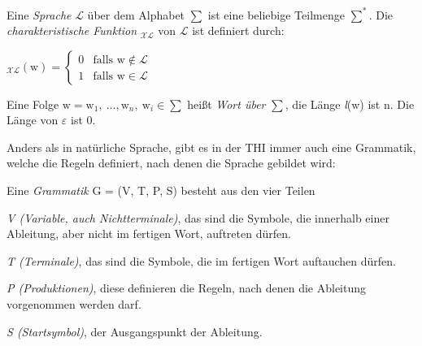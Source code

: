 \documentclass[11pt, a4paper]{article}
\newcommand{\Lagr}{\mathcal{L}}
\begin{document}
\begin{flushleft}
    \begin{tcolorbox}[title = Definition 1.3]
        Eine \emph{Sprache} \(\Lagr\) über dem Alphabet \(\sum\) ist eine beliebige Teilmenge \(\sum^*\). Die \emph{charakteristische Funktion} \(_\mathcal{XL}\) von \(\Lagr\) ist definiert durch:
        \vspace{1em}
        \begin{center}
            \( _\mathcal{XL}(\text{w}) = \begin{cases}
                0 & \text{falls w} \notin \mathcal{L} \\
                1 & \text{falls w} \in \mathcal{L}
            \end{cases}\)
        \end{center}
    \end{tcolorbox}

    \begin{tcolorbox}[title = Definition 1.4]
        Eine Folge \(\text{w} = \text{w}_1,\:\ldots, \text{w}_n,\: \text{w}_i \in \sum\)
        heißt \emph{Wort über} \(\sum\), die Länge \textit{l}(w) ist n. Die Länge von \(\varepsilon\) ist 0.
    \end{tcolorbox}

    Anders als in natürliche Sprache, gibt es in der THI immer auch eine Grammatik, welche die Regeln definiert, nach denen die Sprache gebildet wird:


    \begin{tcolorbox}[title = Definition 1.5]
        Eine \emph{Grammatik} G = (V, T, P, S) besteht aus den vier Teilen

        \begin{description}
            \item\emph{V (Variable, auch Nichtterminale)}, das sind die Symbole, die innerhalb einer Ableitung, aber nicht im fertigen Wort, auftreten dürfen.

            \item\emph{T (Terminale)}, das sind die Symbole, die im fertigen Wort auftauchen dürfen.

            \item\emph{P (Produktionen)}, diese definieren die Regeln, nach denen die Ableitung vorgenommen werden darf.

            \item\emph{S (Startsymbol)}, der Ausgangspunkt der Ableitung.
        \end{description}

    \end{tcolorbox}


\end{flushleft}
\end{document}
